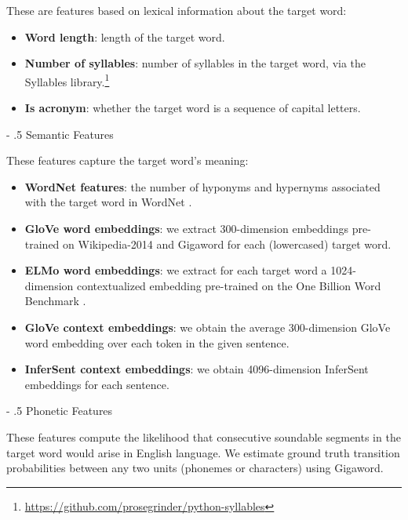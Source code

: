 \documentclass[11pt,a4paper]{article}
\makeatletter
\renewcommand\paragraph{%
    \@startsection{paragraph}{4}{0mm}%
        {-\baselineskip}%
        {.5\baselineskip}%
        {\normalfont\normalsize\bfseries}}
\makeatother
\begin{document}
These are features based on lexical information about the target word:

\begin{itemize}
  \item \textbf{Word length}: length of the target word.
  \item \textbf{Number of syllables}: number of syllables in the target word, via the Syllables library.\footnote{\url{https://github.com/prosegrinder/python-syllables}}
  \item \textbf{Is acronym}: whether the target word is a sequence of capital letters.
\end{itemize}
  
\paragraph{Semantic Features}

These features capture the target word's meaning:

\begin{itemize}
  \item \textbf{WordNet features}: the number of hyponyms and hypernyms associated with the target word in WordNet \citep{Fellbaum:2005}.
  \item \textbf{GloVe word embeddings}: we extract 300-dimension embeddings pre-trained on Wikipedia-2014 and Gigaword \citep{pennington2014glove} for each (lowercased) target word. 
  \item \textbf{ELMo word embeddings}: we extract for each target word a 1024-dimension contextualized embedding pre-trained on the One Billion Word Benchmark \citep{Peters:2018}.
  \item \textbf{GloVe context embeddings}: we obtain the average 300-dimension GloVe word embedding over each token in the given sentence.
  \item \textbf{InferSent context embeddings}: we obtain 4096-dimension InferSent embeddings \citep{conneau-EtAl:2017:EMNLP2017} for each sentence.
\end{itemize}

\paragraph{Phonetic Features}

These features compute the likelihood that consecutive soundable segments in the target word would arise in English language. We estimate ground truth transition probabilities between any two units (phonemes or characters) using Gigaword. 
\end{document}
